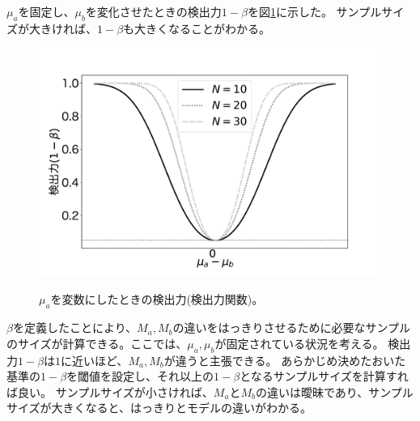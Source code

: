 $\mu_a$を固定し、$\mu_b$を変化させたときの検出力$1-\beta$を図\ref{fig:power_of_test_N_mu0_variable}に示した。
サンプルサイズが大きければ、$1-\beta$も大きくなることがわかる。

\begin{figure}
    \begin{center}
        \includegraphics[width=15cm]{./image/04_/power_of_test.pdf}
        \label{fig:power_of_test_N_mu0_variable}
        \caption{$\mu_a$を変数にしたときの検出力(検出力関数)。}
    \end{center}
\end{figure}

$\beta$を定義したことにより、$M_a,M_b$の違いをはっきりさせるために必要なサンプルのサイズが計算できる。ここでは、$\mu_a,\mu_b$が固定されている状況を考える。
検出力$1-\beta$は$1$に近いほど、$M_a,M_b$が違うと主張できる。
あらかじめ決めたおいた基準の$1-\beta$を閾値を設定し、それ以上の$1-\beta$となるサンプルサイズを計算すれば良い。
サンプルサイズが小さければ、$M_a$と$M_b$の違いは曖昧であり、サンプルサイズが大きくなると、はっきりとモデルの違いがわかる。



